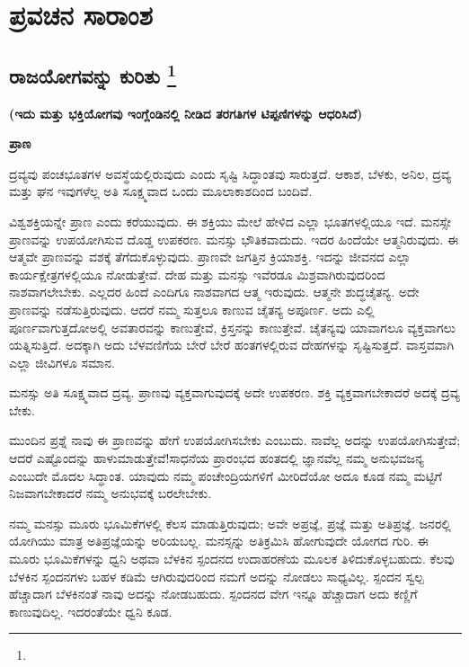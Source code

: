 

\part{ಪ್ರವಚನ ಸಾರಾಂಶ}

\chapter[ರಾಜಯೋಗವನ್ನು ಕುರಿತು ]{ರಾಜಯೋಗವನ್ನು ಕುರಿತು \protect\footnote{}}

\centerline{\textbf{(ಇದು ಮತ್ತು ಭಕ್ತಿಯೋಗವು ಇಂಗ್ಲೆಂಡಿನಲ್ಲಿ ನೀಡಿದ ತರಗತಿಗಳ ಟಿಪ್ಪಣಿಗಳನ್ನು ಆಧರಿಸಿದೆ)}}

\centerline{\textbf{ಪ್ರಾಣ}}

ದ್ರವ್ಯವು ಪಂಚಭೂತಗಳ ಅವಸ್ಥೆಯಲ್ಲಿರುವುದು ಎಂದು ಸೃಷ್ಟಿ ಸಿದ್ಧಾಂತವು ಸಾರುತ್ತದೆ. ಆಕಾಶ, ಬೆಳಕು, ಅನಿಲ, ದ್ರವ್ಯ ಮತ್ತು ಘನ ಇವುಗಳೆಲ್ಲ ಅತಿ ಸೂಕ್ಷ್ಮವಾದ ಒಂದು ಮೂಲಾಕಾಶದಿಂದ ಬಂದಿವೆ.

ವಿಶ್ವಶಕ್ತಿಯನ್ನೇ ಪ್ರಾಣ ಎಂದು ಕರೆಯುವುದು. ಈ ಶಕ್ತಿಯು ಮೇಲೆ ಹೇಳಿದ ಎಲ್ಲಾ ಭೂತಗಳಲ್ಲಿಯೂ ಇದೆ. ಮನಸ್ಸೇ ಪ್ರಾಣವನ್ನು ಉಪಯೋಗಿಸುವ ದೊಡ್ಡ ಉಪಕರಣ. ಮನಸ್ಸು ಭೌತಿಕವಾದುದು. ಇದರ ಹಿಂದೆಯೇ ಆತ್ಮನಿರುವುದು. ಈ ಆತ್ಮವೇ ಪ್ರಾಣವನ್ನು ವಶಕ್ಕೆ ತೆಗೆದುಕೊಳ್ಳುವುದು. ಪ್ರಾಣವೇ ಜಗತ್ತಿನ ಕ್ರಿಯಾಶಕ್ತಿ. ಇದನ್ನು ಜೀವನದ ಎಲ್ಲಾ ಕಾರ್ಯಕ್ಷೇತ್ರಗಳಲ್ಲಿಯೂ ನೋಡುತ್ತೇವೆ. ದೇಹ ಮತ್ತು ಮನಸ್ಸು ಇವೆರಡೂ ಮಿಶ್ರವಾಗಿರುವುದರಿಂದ ನಾಶವಾಗಲೇಬೇಕು. ಎಲ್ಲದರ ಹಿಂದೆ ಎಂದಿಗೂ ನಾಶವಾಗದ ಆತ್ಮ ಇರುವುದು. ಆತ್ಮನೇ ಶುದ್ಧಚೈತನ್ಯ. ಅದೇ ಪ್ರಾಣವನ್ನು ನಡೆಸುತ್ತಿರುವುದು. ಆದರೆ ನಮ್ಮ ಸುತ್ತಲೂ ಕಾಣುವ ಚೈತನ್ಯ ಅಪೂರ್ಣ. ಅದು ಎಲ್ಲಿ ಪೂರ್ಣವಾಗುತ್ತದೋ\break ಅಲ್ಲಿ ಅವತಾರವನ್ನು ಕಾಣುತ್ತೇವೆ, ಕ್ರಿಸ್ತನನ್ನು ಕಾಣುತ್ತೇವೆ. ಚೈತನ್ಯವು ಯಾವಾಗಲೂ ವ್ಯಕ್ತವಾಗಲು ಯತ್ನಿಸುತ್ತಿದೆ. ಅದಕ್ಕಾಗಿ ಅದು ಬೆಳವಣಿಗೆಯ ಬೇರೆ ಬೇರೆ ಹಂತಗಳಲ್ಲಿರುವ ದೇಹಗಳನ್ನು ಸೃಷ್ಟಿಸುತ್ತದೆ. ವಾಸ್ತವವಾಗಿ ಎಲ್ಲಾ ಜೀವಿಗಳೂ ಸಮಾನ.

ಮನಸ್ಸು ಅತಿ ಸೂಕ್ಷ್ಮವಾದ ದ್ರವ್ಯ. ಪ್ರಾಣವು ವ್ಯಕ್ತವಾಗುವುದಕ್ಕೆ ಅದೇ ಉಪಕರಣ. ಶಕ್ತಿ ವ್ಯಕ್ತವಾಗಬೇಕಾದರೆ ಅದಕ್ಕೆ ದ್ರವ್ಯ ಬೇಕು.

ಮುಂದಿನ ಪ್ರಶ್ನೆ ನಾವು ಈ ಪ್ರಾಣವನ್ನು ಹೇಗೆ ಉಪಯೋಗಿಸಬೇಕು ಎಂಬುದು. ನಾವೆಲ್ಲ ಅದನ್ನು ಉಪಯೋಗಿಸುತ್ತೇವೆ; ಆದರೆ ಎಷ್ಟೊಂದನ್ನು ಹಾಳುಮಾಡುತ್ತೇವೆ!\break ಸಾಧನೆಯ ಪ್ರಾರಂಭದ ಹಂತದಲ್ಲಿ ಜ್ಞಾನವೆಲ್ಲ ನಮ್ಮ ಅನುಭವಜನ್ಯ ಎಂಬುದೇ ಮೊದಲ ಸಿದ್ಧಾಂತ. ಯಾವುದು ನಮ್ಮ ಪಂಚೇಂದ್ರಿಯಗಳಿಗೆ ಮೀರಿದೆಯೋ ಅದೂ ಕೂಡ ನಮ್ಮ ಮಟ್ಟಿಗೆ ನಿಜವಾಗಬೇಕಾದರೆ ನಮ್ಮ ಅನುಭವಕ್ಕೆ ಬರಲೇಬೇಕು.

ನಮ್ಮ ಮನಸ್ಸು ಮೂರು ಭೂಮಿಕೆಗಳಲ್ಲಿ ಕೆಲಸ ಮಾಡುತ್ತಿರುವುದು; ಅವೇ ಅಪ್ರಜ್ಞೆ, ಪ್ರಜ್ಞೆ ಮತ್ತು ಅತಿಪ್ರಜ್ಞೆ. ಜನರಲ್ಲಿ ಯೋಗಿಯು ಮಾತ್ರ ಅತಿಪ್ರಜ್ಞೆಯನ್ನು ಅರಿಯಬಲ್ಲ. ಮನಸ್ಸನ್ನು ಅತಿಕ್ರಮಿಸಿ ಹೋಗುವುದೇ ಯೋಗದ ಗುರಿ. ಈ ಮೂರು ಭೂಮಿಕೆಗಳನ್ನು ಧ್ವನಿ ಅಥವಾ ಬೆಳಕಿನ ಸ್ಪಂದನದ ಉದಾಹರಣೆಯ ಮೂಲಕ ತಿಳಿದುಕೊಳ್ಳಬಹುದು. ಕೆಲವು ಬೆಳಕಿನ ಸ್ಪಂದನಗಳು ಬಹಳ ಕಡಿಮೆ ಆಗಿರುವುದರಿಂದ ನಮಗೆ ಅದನ್ನು ನೋಡಲು ಸಾಧ್ಯವಿಲ್ಲ. ಸ್ಪಂದನ ಸ್ವಲ್ಪ ಹೆಚ್ಚಾದಾಗ ಬೆಳಕಿನಂತೆ ನಾವು ಅದನ್ನು ನೋಡಬಹುದು. ಸ್ಪಂದನದ ವೇಗ ಇನ್ನೂ ಹೆಚ್ಚಾದಾಗ ಅದು ಕಣ್ಣಿಗೆ ಕಾಣುವುದಿಲ್ಲ. ಇದರಂತೆಯೇ ಧ್ವನಿ ಕೂಡ.

